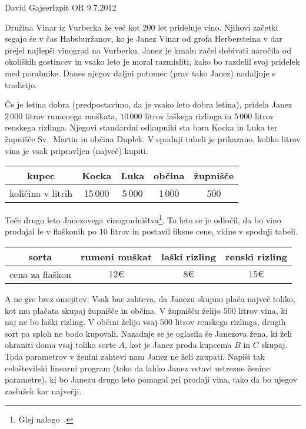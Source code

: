 \begin{naloga}{David Gajser}{Izpit OR 9.7.2012}
\begin{vprasanje}
Družina Vinar iz Vurberka že več kot $200$ let prideluje vino.
Njihovi začetki segajo še v čas Habsburžanov,
ko je Janez Vinar od grofa Herbersteina
v dar prejel najlepši vinograd na Vurberku.
Janez je kmalu začel dobivati naročila od okoliških gostincev
in vsako leto je moral razmisliti,
kako bo razdelil svoj pridelek med porabnike.
Danes njegov daljni potomec (prav tako Janez) nadaljuje s tradicijo.

Če je letina dobra (predpostavimo, da je vsako leto dobra letina),
pridela Janez $2\,000$ litrov rumenega muškata,
$10\,000$ litrov laškega rizlinga in $5\,000$ litrov renskega rizlinga.
Njegovi standardni odkupniki sta bara Kocka in Luka
ter župnišče Sv.~Martin in občina Duplek.
V spodnji tabeli je prikazano,
koliko litrov vina je vsak pripravljen (največ) kupiti.
\begin{center}
\begin{tabular}{c|cccc}
kupec & Kocka & Luka & občina & župnišče \\ \hline
količina v litrih & 15\,000 & 5\,000 & 1\,000 & 500
\end{tabular}
\end{center}
Teče drugo leto Janezovega vinogradništva\footnote{
Glej nalogo~\nal[vinar].
}.
To leto se je odločil,
da bo vino prodajal le v flaškonih po $10$ litrov
in postavil fiksne cene, vidne v spodnji tabeli.
\begin{center}
\begin{tabular}{c|ccc}
sorta & rumeni muškat & laški rizling & renski rizling \\ \hline
cena za flaškon & $12 €$ & $8 €$ & $15 €$
\end{tabular}
\end{center}
A ne gre brez omejitev.
Vsak bar zahteva, da Janezu skupno plača največ toliko,
kot mu plačata skupaj župnišče in občina.
V župnišču želijo $500$ litrov vina, ki naj ne bo laški rizling.
V občini želijo vsaj $500$ litrov renskega rizlinga,
drugih sort pa sploh ne bodo kupovali.
Nazadnje se je oglasila še Janezova žena,
ki želi ohraniti doma vsaj toliko sorte $A$,
kot je Janez proda kupcema $B$ in $C$ skupaj.
Toda parametrov v ženini zahtevi nam Janez ne želi zaupati.
Napiši tak celoštevilski linearni program
(tako da lahko Janez vstavi ustrezne ženine parametre),
ki bo Janezu drugo leto pomagal pri prodaji vina,
tako da bo njegov zaslužek kar največji.
\end{vprasanje}


\end{naloga}
